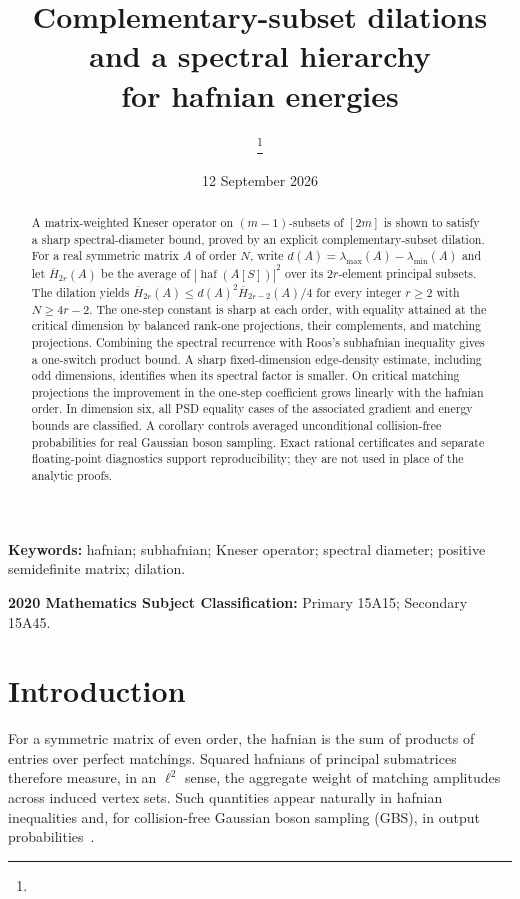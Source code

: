 \documentclass[11pt]{article}
\title{Complementary-subset dilations and a spectral hierarchy\\for hafnian energies}
\author{\ManuscriptAuthors\thanks{\ManuscriptAuthorNote}}
\date{12 September 2026}
\theoremstyle{remark}\newtheorem{remark}[theorem]{Remark}
\DeclareMathOperator{\haf}{haf}\DeclareMathOperator{\tr}{tr}
\begin{document}
\maketitle

\begin{abstract}
A matrix-weighted Kneser operator on $(m-1)$-subsets of $[2m]$ is shown to
satisfy a sharp spectral-diameter bound, proved by an explicit
complementary-subset dilation. For a real symmetric matrix $A$ of order $N$,
write $d(A)=\lambda_{\max}(A)-\lambda_{\min}(A)$ and let $\overline H_{2r}(A)$
be the average of $|\haf(A[S])|^2$ over its $2r$-element principal subsets.
The dilation yields
$\overline H_{2r}(A)\le d(A)^2\overline H_{2r-2}(A)/4$
for every integer $r\ge2$ with $N\ge4r-2$. The one-step constant is sharp
at each order, with equality attained at the critical dimension by balanced
rank-one projections, their complements, and matching projections.
Combining the spectral recurrence with Roos's subhafnian inequality gives a
one-switch product bound. A sharp fixed-dimension edge-density estimate,
including odd dimensions, identifies when its spectral factor is smaller.
On critical matching projections the improvement in the one-step coefficient
grows linearly with the hafnian order. In dimension six, all PSD equality
cases of the associated gradient and energy bounds are classified.
A corollary controls averaged unconditional collision-free probabilities for
real Gaussian boson sampling. Exact rational certificates and separate
floating-point diagnostics support reproducibility; they are not used in
place of the analytic proofs.
\end{abstract}

\noindent\textbf{Keywords:} hafnian; subhafnian; Kneser operator; spectral diameter;
positive semidefinite matrix; dilation.

\noindent\textbf{2020 Mathematics Subject Classification:} Primary 15A15; Secondary 15A45.

\section{Introduction}
For a symmetric matrix of even order, the hafnian is the sum of products of
entries over perfect matchings.  Squared hafnians of principal submatrices
therefore measure, in an $\ell^2$ sense, the aggregate weight of matching
amplitudes across induced vertex sets.  Such quantities appear naturally in
hafnian inequalities and, for collision-free Gaussian boson sampling (GBS),
in output probabilities~\cite{hamilton,kruse,arrazola}.
\end{document}
